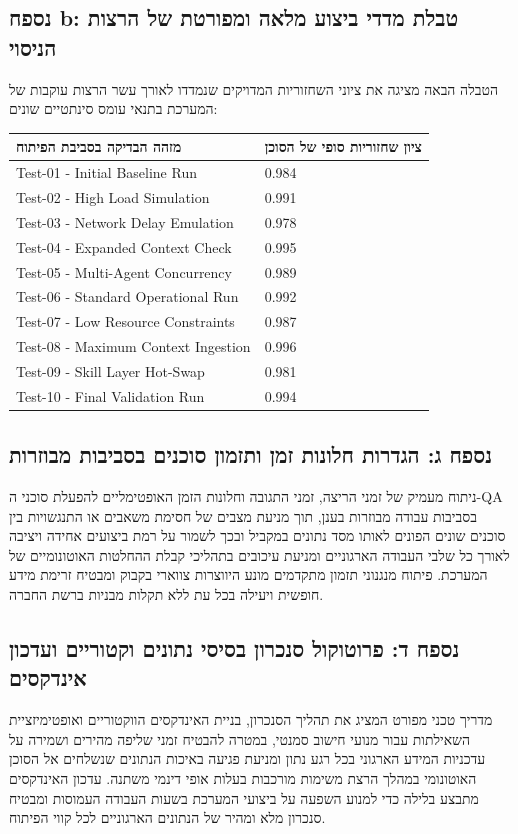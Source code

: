 \documentclass{hebrew-academic-template}
\begin{document}
\subsection{נספח b: טבלת מדדי ביצוע מלאה ומפורטת של הרצות הניסוי}
הטבלה הבאה מציגה את ציוני השחזוריות המדויקים שנמדדו לאורך עשר הרצות עוקבות של המערכת בתנאי עומס סינתטיים שונים:
\begin{center}
\begin{tabularx}{\linewidth}{|X|X|}
\hline
\textbf{מזהה הבדיקה בסביבת הפיתוח} & \textbf{ציון שחזוריות סופי של הסוכן} \\ \hline
Test-01 - Initial Baseline Run & 0.984 \\ \hline
Test-02 - High Load Simulation & 0.991 \\ \hline
Test-03 - Network Delay Emulation & 0.978 \\ \hline
Test-04 - Expanded Context Check & 0.995 \\ \hline
Test-05 - Multi-Agent Concurrency & 0.989 \\ \hline
Test-06 - Standard Operational Run & 0.992 \\ \hline
Test-07 - Low Resource Constraints & 0.987 \\ \hline
Test-08 - Maximum Context Ingestion & 0.996 \\ \hline
Test-09 - Skill Layer Hot-Swap & 0.981 \\ \hline
Test-10 - Final Validation Run & 0.994 \\ \hline
\end{tabularx}
\end{center}

\subsection{נספח ג: הגדרות חלונות זמן ותזמון סוכנים בסביבות מבוזרות}
ניתוח מעמיק של זמני הריצה, זמני התגובה וחלונות הזמן האופטימליים להפעלת סוכני ה-QA בסביבות עבודה מבוזרות בענן, תוך מניעת מצבים של חסימת משאבים או התנגשויות בין סוכנים שונים הפונים לאותו מסד נתונים במקביל ובכך לשמור על רמת ביצועים אחידה ויציבה לאורך כל שלבי העבודה הארגוניים ומניעת עיכובים בתהליכי קבלת ההחלטות האוטונומיים של המערכת. פיתוח מנגנוני תזמון מתקדמים מונע היווצרות צווארי בקבוק ומבטיח זרימת מידע חופשית ויעילה בכל עת ללא תקלות מבניות ברשת החברה.

\subsection{נספח ד: פרוטוקול סנכרון בסיסי נתונים וקטוריים ועדכון אינדקסים}
מדריך טכני מפורט המציג את תהליך הסנכרון, בניית האינדקסים הווקטוריים ואופטימיזציית השאילתות עבור מנועי חישוב סמנטי, במטרה להבטיח זמני שליפה מהירים ושמירה על עדכניות המידע הארגוני בכל רגע נתון ומניעת פגיעה באיכות הנתונים שנשלחים אל הסוכן האוטונומי במהלך הרצת משימות מורכבות בעלות אופי דינמי משתנה. עדכון האינדקסים מתבצע בלילה כדי למנוע השפעה על ביצועי המערכת בשעות העבודה העמוסות ומבטיח סנכרון מלא ומהיר של הנתונים הארגוניים לכל קווי הפיתוח.
\end{document}
